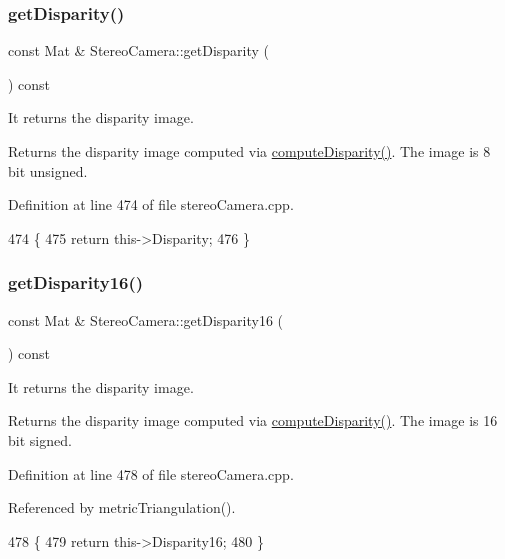 \subsubsection{\texorpdfstring{get\+Disparity()}{getDisparity()}}
{\footnotesize\ttfamily const Mat \& Stereo\+Camera\+::get\+Disparity (\begin{DoxyParamCaption}{ }\end{DoxyParamCaption}) const}



It returns the disparity image. 

\begin{DoxyReturn}{Returns}
the disparity image computed via \hyperlink{classStereoCamera_a79e986f2970bb2c5b5acd1ede65984aa}{compute\+Disparity()}. The image is 8 bit unsigned. 
\end{DoxyReturn}


Definition at line 474 of file stereo\+Camera.\+cpp.


\begin{DoxyCode}
474                                             \{
475     \textcolor{keywordflow}{return} this->Disparity;
476 \}
\end{DoxyCode}
\mbox{\label{classStereoCamera_a4a6e408446750224499ed9ecdc51629e}} 
\subsubsection{\texorpdfstring{get\+Disparity16()}{getDisparity16()}}
{\footnotesize\ttfamily const Mat \& Stereo\+Camera\+::get\+Disparity16 (\begin{DoxyParamCaption}{ }\end{DoxyParamCaption}) const}



It returns the disparity image. 

\begin{DoxyReturn}{Returns}
the disparity image computed via \hyperlink{classStereoCamera_a79e986f2970bb2c5b5acd1ede65984aa}{compute\+Disparity()}. The image is 16 bit signed. 
\end{DoxyReturn}


Definition at line 478 of file stereo\+Camera.\+cpp.



Referenced by metric\+Triangulation().


\begin{DoxyCode}
478                                               \{
479     \textcolor{keywordflow}{return} this->Disparity16;
480 \}
\end{DoxyCode}
\mbox{\label{classStereoCamera_af9e52f941837f0db26d150d0ca4ff3bc}} 
